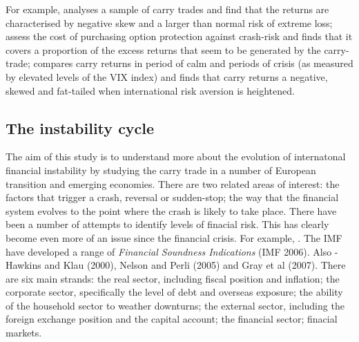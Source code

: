\documentclass[12pt, a4paper, oneside]{article} %
\begin{document}
For example, \citet{BrunnermeierCarry} analyses a sample of carry trades and find that the returns are characterised by negative skew and a larger than normal risk of extreme loss; \citet{JurekCrash} assess the cost of purchasing option protection against crash-risk and finds that it covers a proportion of the excess returns that seem to be generated by the carry-trade; \citet{Hayward2013} compares carry returns in period of calm and periods of crisis (as measured by elevated levels of the VIX index) and finds that carry returns a negative, skewed and fat-tailed when international risk aversion is heightened.  


\subsection{The instability cycle}
The aim of this study is to understand more about the evolution of internatonal financial instability by studying the carry trade in a number of European transition and emerging economies. There are two related areas of interest:  the factors that trigger a crash, reversal or sudden-stop; the way that the financial system evolves to the point where the crash is likely to take place.  There have been a number of attempts to identify levels of finacial risk.  This has clearly become even more of an issue since the financial crisis.  For example, \citet{IFCMeasure}.  The IMF have developed a range of \emph{Financial Soundness Indications} (IMF 2006).     Also - Hawkins and Klau (2000), Nelson and Perli (2005) and Gray et al (2007).  There are six main strands:  the real sector, including fiscal position and inflation; the corporate sector, specifically the level of debt and overseas exposure; the ability of the household sector to weather downturns; the external sector, including the foreign exchange position and the capital account; the financial sector; finacial markets. 
\end{document}
